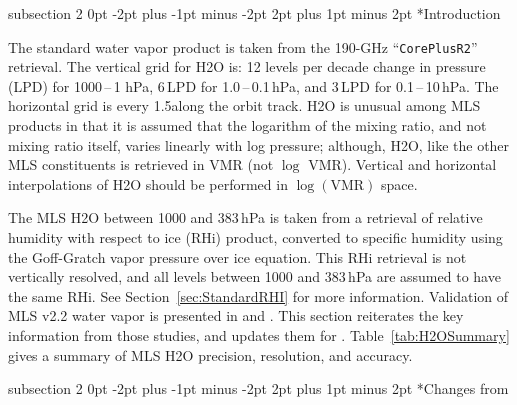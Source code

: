 \documentclass[11pt,draft]{report}
\makeatletter
\renewcommand{\subsection}{\@startsection%
  {subsection}%
  {2}%
  {0pt}%
  {-2pt plus -1pt minus -2pt}%
  {2pt plus 1pt minus 2pt}%
  {\large\sffamily\fontseries{sb}\selectfont\flushleft\color{SectionColor}\figureversion{tabular}}}%
\makeatother
\begin{document}
\subsection*{Introduction}

The standard water vapor product is taken from the 190-GHz
``\texttt{CorePlusR2}'' retrieval. The vertical grid for H\cs2O is: 12
levels per decade change in pressure (LPD) for 1000\,--\,1 hPa, 6\,LPD
for 1.0\,--\,0.1\,hPa, and 3\,LPD for 0.1\,--\,10\,hPa. The
horizontal grid is every 1.5\degsym along the orbit track.  H\cs2O is
unusual among MLS products in that it is assumed that the logarithm of
the mixing ratio, and not mixing ratio itself, varies linearly with log
pressure; although, H\cs2O, like the other MLS constituents is retrieved
in VMR (not $\log$ VMR). Vertical and horizontal interpolations of
H\cs2O should be performed in $\log(\text{VMR})$ space.

The MLS \thisv H\cs2O between 1000 and 383\,hPa is taken from a
retrieval of relative humidity with respect to ice (RHi) product,
converted to specific humidity using the Goff-Gratch vapor pressure over
ice equation.  This RHi retrieval is not vertically resolved, and all
levels between 1000 and 383\,hPa are assumed to have the same RHi.  See
Section~\ref{sec:StandardRHI} for more information. Validation of MLS
v2.2 water vapor is presented in \citet{ReadEtal07} and
\citet{LambertEtal07}.  This section reiterates the key information from
those studies, and updates them for \thisv.  Table~\ref{tab:H2OSummary}
gives a summary of MLS \thisv H\cs2O precision, resolution, and accuracy.

\subsection*{Changes from \prevv}
\end{document}
